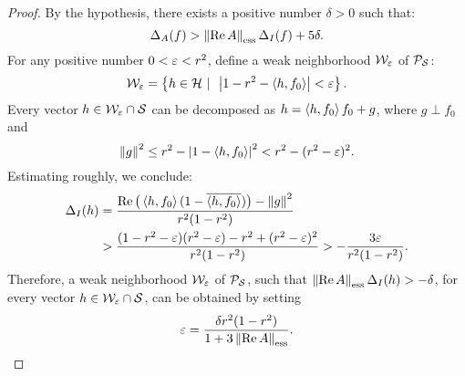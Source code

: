 \begin{proof}
By the hypothesis, there exists a positive number $\delta>0$ such that:
\begin{equation}\label{e:EC1}
  \Delta_A(f) > \essnorm{\RE{}A}\Delta_I(f) + 5\delta.
\end{equation}
For any positive number $0<\varepsilon<r^2$, define a weak neighborhood ${\cal W}_\varepsilon$ of
${\cal P}_{{\cal S}}$:
\[ {\cal W}_\varepsilon = \left\{h\in{\cal H}\,\,|\,\,\,\left\vert1-r^2-\left<h,f_0\right>\right\vert < \varepsilon\right\}. \]
Every vector $h\in{\cal W}_\varepsilon\cap{\cal S}$ can be decomposed as $h=\left<h,f_0\right>f_0+g$,
where $g \perp f_0$ and
\[ \left\Vert g\right\Vert^2 \leq r^2 - \left\vert1-\left<h,f_0\right>\right\vert^2 < r^2 - (r^2 -\varepsilon)^2. \]
Estimating roughly, we conclude:
\begin{equation*}
  \begin{split}
   \Delta_I(h) &=
    \frac{\operatorname{Re}\big(\left<h,f_0\right>(1-\overline{\left<h,f_0\right>})\big)
         -\left\Vert g\right\Vert^2}{r^2(1-r^2)}\\
    &>\frac{(1-r^2-\varepsilon)(r^2-\varepsilon)-r^2+(r^2-\varepsilon)^2}{r^2(1-r^2)} >
    -\frac{3\varepsilon}{r^2(1-r^2)}.
  \end{split}
\end{equation*}
Therefore, a weak neighborhood ${\cal W}_\varepsilon$ of ${\cal P}_{{\cal S}}$, such that
$\essnorm{\RE{}A} \Delta_I(h) > -\delta$, for every vector
$h\in{\cal W}_\varepsilon\cap{\cal S}$, can be obtained by setting
\[ \eps=\frac{\delta{}r^2(1-r^2)}{1+3\essnorm{\RE{}A}}. \]


\end{proof}
